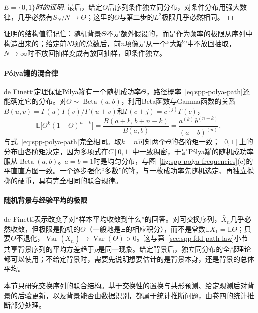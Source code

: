 \begin{proof}[$E=\{0,1\}$时的证明]
最后，给定$\Theta$后序列条件独立同分布，对条件分布用强大数律，几乎必然有$S_N/N\to\Theta$；这里的$\Theta$与第二步的$L^2$极限几乎必然相同。
\end{proof}

证明的结构值得记住：随机背景$\Theta$不是额外假设的，而是作为频率的极限从序列中构造出来的；给定前$N$项的总数后，前$n$项像是从一个“大罐”中不放回抽取，$N\to\infty$时不放回抽样变成有放回抽样，即条件独立。

\paragraph{Pólya罐的混合律}
de Finetti定理保证Pólya罐有一个随机成功率$\Theta$，路径概率~\eqref{eq:spp-polya-path}还能确定它的分布。对$\Theta\sim\operatorname{Beta}(a,b)$，利用Beta函数与Gamma函数的关系$B(u,v)=\Gamma(u)\Gamma(v)/\Gamma(u+v)$和$\Gamma(c+j)=c^{(j)}\Gamma(c)$，
\[
  \mathbb E\bigl[\Theta^k(1-\Theta)^{n-k}\bigr]=\frac{B(a+k,\,b+n-k)}{B(a,b)}=\frac{a^{(k)}\,b^{(n-k)}}{(a+b)^{(n)}} ,
\]
与式~\eqref{eq:spp-polya-path}完全相同。取$k=n$可知两个$\Theta$的各阶矩一致；$[0,1]$上的分布由各阶矩决定，因为多项式在$C[0,1]$中一致稠密，于是Pólya罐的随机成功率服从$\operatorname{Beta}(a,b)$。$a=b=1$时是均匀分布，与图~\ref{fig:spp-polya-frequencies}(c)的平直直方图一致。一个逐步强化“多数”的罐，与一枚成功率先随机选定、再独立抛掷的硬币，具有完全相同的联合规律。

\paragraph{随机背景与经验平均的极限}
de Finetti表示改变了对“样本平均收敛到什么”的回答。对可交换序列，$\bar X_n$几乎必然收敛，但极限是随机的$\Theta$（一般地是$\Xi$的相应积分），而不是常数$\mathbb EX_1=\mathbb E\Theta$；只要$\Theta$不退化，$\operatorname{Var}(\bar X_n)\to\operatorname{Var}(\Theta)>0$。这与第~\ref{sec:spp-fdd-path-law}小节共享背景序列的平均方差趋于$\rho$是同一现象。给定背景后，独立同分布的全部理论都可以使用；不给定背景时，需要先说明想要估计的是背景本身，还是背景的总体平均。

本节只研究交换序列的联合结构。基于交换性的置换与共形预测、给定观测后对背景的后验更新，以及背景能否由数据识别，都属于统计推断问题，由卷四的统计推断部分处理。
